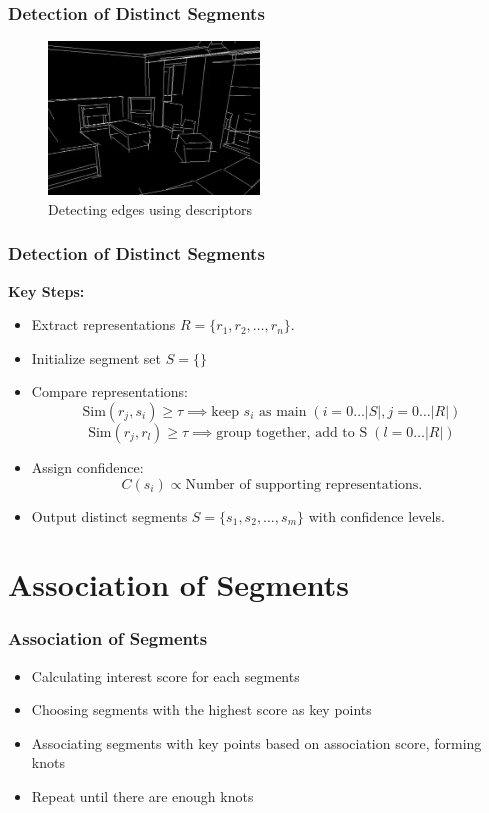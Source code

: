 \documentclass{beamer}
\begin{document}
\begin{frame}
\frametitle{Detection of Distinct Segments}

\begin{figure}[htbp]
    \centering
    \includegraphics[width=0.5\textwidth]{images/edgedet.png}
    \caption{Detecting edges using descriptors}
    \label{fig:desc_objdet}
\end{figure}

\end{frame}

\begin{frame}
\frametitle{Detection of Distinct Segments}
\textbf{Key Steps:}
    \begin{itemize}
        \item Extract representations \( R = \{r_1, r_2, \dots, r_n\} \).
        \item Initialize segment set \(S=\{\}\)
        \item Compare representations:
        \[
        \text{Sim}(r_j,s_i) \geq \tau \implies \text{keep } s_i \text{ as main} \; (i = 0 \dots \lvert S \lvert, j=0\dots \lvert R \lvert)
         \]
         \[
         \text{Sim}(r_j, r_l) \geq \tau \implies \text{group together, add to S} \; (l=0\dots \lvert R \lvert)
         \]
        \item Assign confidence:
        \[
        C(s_i) \propto \text{Number of supporting representations.}
        \]
        \item Output distinct segments \( S = \{s_1, s_2, \dots, s_m\} \) with confidence levels.
    \end{itemize}
\end{frame}


\section{Association of Segments}
\begin{frame}
\frametitle{Association of Segments}
\begin{itemize}
    \item Calculating interest score for each segments
    \item Choosing segments with the highest score as key points
    \item Associating segments with key points based on association score, forming knots
    \item Repeat until there are enough knots
\end{itemize}
\end{frame}
\end{document}

